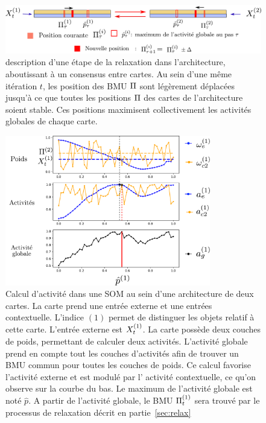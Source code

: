 \begin{figure}
\centering
\includegraphics[width=\textwidth]{relaxation_2maps.pdf}
\caption{description d'une étape de la relaxation dans l'architecture, aboutissant à un consensus entre cartes. Au sein d'une même itération $t$, les position des BMU $\Pi$ sont légèrement déplacées jusqu'à ce que toutes les positions $\Pi$ des cartes de l'architecture soient stable. Ces positions maximisent collectivement les activités globales de chaque carte. \label{fig:relax}}
\end{figure}

\begin{figure}
\centering
\includegraphics[width=0.8\textwidth]{activite_layers_2maps.pdf}
\caption{Calcul d'activité dans une SOM au sein d'une architecture de deux cartes. La carte prend une entrée externe et une entrées contextuelle. L'indice $(1)$ permet de distinguer les objets relatif à cette carte. L'entrée externe est $X^{({1})}_t$. La carte possède deux couches de poids, permettant de calculer deux activités. L'activité globale prend en compte tout les couches d'activités afin de trouver un BMU commun pour toutes les couches de poids. Ce calcul favorise l'activité externe et est modulé par l' activité contextuelle, ce qu'on observe sur la courbe du bas. Le maximum de l'activité globale est noté $\hat{p}$. A partir de l'activité globale, le BMU $\Pi^{({1})}_t$ sera trouvé par le processus de relaxation décrit en partie~\ref{sec:relax}\label{fig:2som_activite}}

\end{figure}


